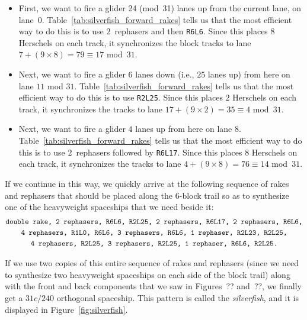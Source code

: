 \begin{itemize}
	\item First, we want to fire a glider 24 (mod~31) lanes up from the current lane, on lane~0. Table~\ref{tab:silverfish_forward_rakes} tells us that the most efficient way to do this is to use $2$~rephasers and then \texttt{R6L6}. Since this places $8$ Herschels on each track, it synchronizes the block tracks to lane $7 + (9 \times 8) = 79 \equiv 17$ mod~$31$.\smallskip
	
	\item Next, we want to fire a glider $6$ lanes down (i.e., $25$ lanes up) from here on lane $11$ mod $31$. Table~\ref{tab:silverfish_forward_rakes} tells us that the most efficient way to do this is to use \texttt{R2L25}. Since this places $2$ Herschels on each track, it synchronizes the tracks to lane $17 + (9 \times 2) = 35 \equiv 4$ mod~$31$.\smallskip
	
	\item Next, we want to fire a glider $4$ lanes up from here on lane $8$. Table~\ref{tab:silverfish_forward_rakes} tells us that the most efficient way to do this is to use $2$~rephasers followed by \texttt{R6L17}. Since this places $8$ Herschels on each track, it synchronizes the tracks to lane $4 + (9 \times 8) = 76 \equiv 14$ mod~$31$.\smallskip
\end{itemize}

If we continue in this way, we quickly arrive at the following sequence of rakes and rephasers that should be placed along the $6$-block trail so as to synthesize one of the heavyweight spaceships that we need beside it:
\begin{gather*}
	\text{\texttt{double rake, 2 rephasers, R6L6, R2L25, 2 rephasers, R6L17, 2 rephasers, R6L6,}} \\
	\text{\texttt{4 rephasers, R1L0, R6L6, 3 rephasers, R6L6, 1 rephaser, R2L23, R2L25,}} \\
	\text{\texttt{4 rephasers, R2L25, 3 rephasers, R2L25, 1 rephaser, R6L6, R2L25.}}
\end{gather*}



If we use two copies of this entire sequence of rakes and rephasers (since we need to synthesize two heavyweight spaceships on each side of the block trail) along with the front and back components that we saw in Figures~?? and~??, we finally get a $31c/240$ orthogonal spaceship. This pattern is called the \emph{silverfish}, and it is displayed in Figure~\ref{fig:silverfish}.

